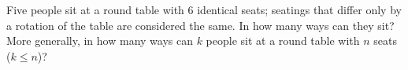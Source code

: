Five people sit at a round table with $6$ identical seats; seatings that differ only by a rotation of the table are considered the same. In how many ways can they sit? More generally, in how many ways can $k$ people sit at a round table with $n$ seats ($k\le n$)?

